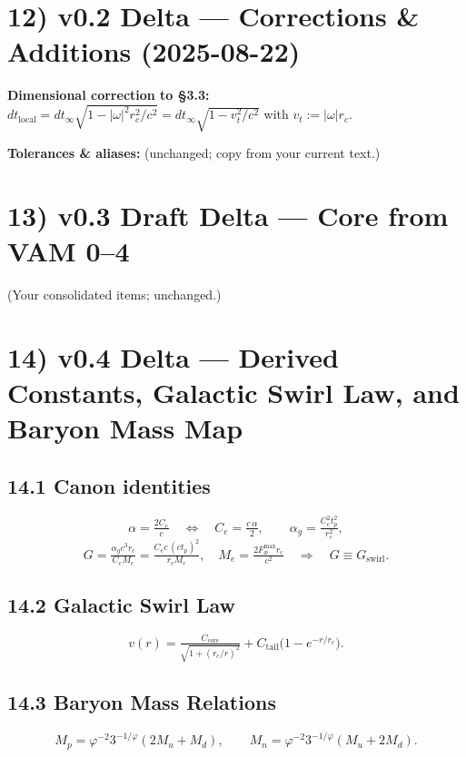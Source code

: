 \documentclass[11pt,a4paper]{article}
\begin{document}
    \section*{12) v0.2 Delta — Corrections \& Additions (2025-08-22)}
    \textbf{Dimensional correction to §3.3:} $dt_{\text{local}} = dt_{\infty}\sqrt{1 - |\omega|^2 r_c^2 / c^2} = dt_{\infty}\sqrt{1 - v_t^2/c^2}$ with $v_t:=|\omega|r_c$.
    \medskip

    \textbf{Tolerances \& aliases:} (unchanged; copy from your current text.)

    \section*{13) v0.3 Draft Delta — Core from VAM 0–4}
    (Your consolidated items; unchanged.)

    \section*{14) v0.4 Delta — Derived Constants, Galactic Swirl Law, and Baryon Mass Map}
    \subsection*{14.1 Canon identities}
    \[
        \boxed{\alpha = \tfrac{2 C_e}{c}}\quad\Leftrightarrow\quad \boxed{C_e = \tfrac{c\,\alpha}{2}},\qquad
        \boxed{\alpha_g = \tfrac{C_e^{2} t_p^{2}}{r_c^{2}}},
    \]
    \[
        \boxed{G = \tfrac{\alpha_g c^{3} r_c}{C_e M_e} = \tfrac{C_e c\, (c t_p)^{2}}{r_c M_e}},
        \quad
        \boxed{M_e = \tfrac{2 F_{\text{\ae}}^{\max} r_c}{c^{2}}}
        \quad\Rightarrow\quad
        \boxed{G \equiv G_{\text{swirl}}}.
    \]
    \subsection*{14.2 Galactic Swirl Law}
    \[
        \boxed{v(r) = \tfrac{C_{\text{core}}}{\sqrt{1 + (r_c/r)^2}} + C_{\text{tail}}\big(1 - e^{-r/r_c}\big)}.
    \]
    \subsection*{14.3 Baryon Mass Relations}
    \[
        \boxed{M_p = \varphi^{-2} 3^{-1/\varphi}(2 M_u + M_d)},\qquad
        \boxed{M_n = \varphi^{-2} 3^{-1/\varphi}(M_u + 2 M_d)}.
    \]
\end{document}
